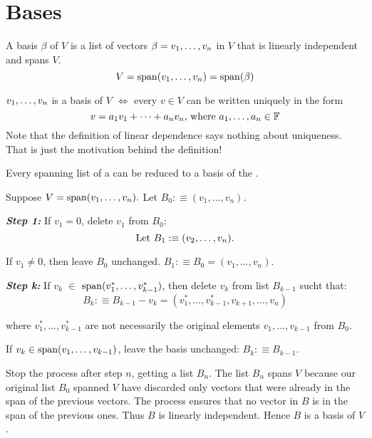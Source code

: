 \section{Bases}


\setcounter{thm}{25}
\begin{mydef} [Basis]
  A basis $\beta$ of $V$ is a list of vectors $\beta = v_1, \dots, v_n$ in $V$ that is linearly independent and spans $V$.
  \begin{equation}
    V = \operatorname{span} (v_1, \dots, v_n) = \operatorname{span} ( \beta )
  \end{equation}
\end{mydef}

\setcounter{thm}{27}
\begin{thm} 
  $v_1, \dots, v_n$ is a basis of $V$ $\iff$ every $v \in V$ can be written uniquely in the form
  \begin{equation}
    v=a_1 v_1 + \dots + a_n v_n $, where $ a_1, \dots, a_n \in \myF
  \end{equation}
  Note that the definition of linear dependence says nothing about uniqueness. That is just the motivation behind the definition!
\end{thm}

\setcounter{thm}{29}
\begin{thm}  
  \label{thm: every spanning list contains a basis}
  Every spanning list of a \vs can be reduced to a basis of the \vs.
\end{thm}
\begin{prf}
  Suppose $V=\operatorname{span} (v_1, \ldots, v_n).$ Let $B_0 :\equiv (v_1, \ldots, v_n)$.
  
  \emph{\bfseries Step 1: } If $v_1 = 0$, delete $v_1$ from $B_0$: 
  \begin{equation}
    $Let $B_1 :\equiv (v_2, \ldots, v_n).
  \end{equation} 
  
  If $v_1 \neq 0$, then leave $B_0$ unchanged. $B_1 :\equiv B_0=(v_1, \ldots, v_n)$.
  
  \emph{\bfseries Step k: } If $v_k$ $\in$ $\operatorname{span} (v_1^*, \ldots, v_{k-1}^*)$, then delete $v_k$ from list $B_{k-1}$ sucht that:
  \begin{equation}
    B_k :\equiv B_{k-1} - v_k = (v_{1}^*, \ldots, v_{k-1}^*, v_{k+1}, \ldots, v_n)
  \end{equation} 
  
  where $v_1^*, \ldots, v_{k-1}^*$ are not necessarily the original elements $v_1, \ldots, v_{k-1}$ from $B_0$.
  
  If $v_k \in \operatorname{span} (v_1, \ldots, v_{k-1})$, leave the basis unchanged: $B_k :\equiv B_{k-1}$.
  
  Stop the process after step $n$, getting a list $B_n$. The list $B_n$ spans $V$ because our original list $B_0$ spanned $V$  have discarded only vectors that were already in the span of the previous vectors. The process ensures that no vector in $B$ is in the span of the previous ones. Thus $B$ is linearly independent. Hence $B$ is a basis of $V$.
\end{prf}

